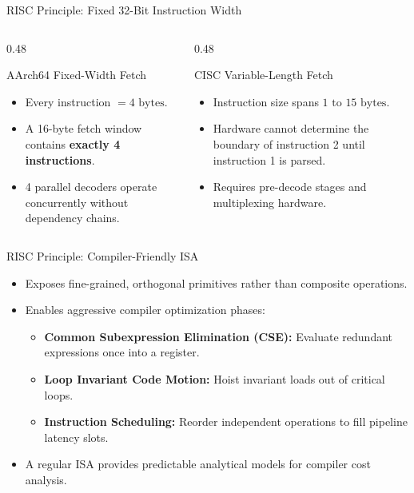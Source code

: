 \documentclass[aspectratio=169,11pt,t]{beamer}
\newcommand{\key}[1]{\textbf{#1}}
\begin{document}
\begin{frame}{RISC Principle: Fixed 32-Bit Instruction Width}
\begin{columns}[T,onlytextwidth]
\begin{column}{0.48\textwidth}
\begin{block}{AArch64 Fixed-Width Fetch}
\begin{itemize}\setlength{\itemsep}{5pt}
  \item Every instruction $= 4\text{ bytes}$.
  \item A 16-byte fetch window contains \key{exactly 4 instructions}.
  \item 4 parallel decoders operate concurrently without dependency chains.
\end{itemize}
\end{block}
\end{column}

\begin{column}{0.48\textwidth}
\begin{block}{CISC Variable-Length Fetch}
\begin{itemize}\setlength{\itemsep}{5pt}
  \item Instruction size spans $1\text{ to } 15\text{ bytes}$.
  \item Hardware cannot determine the boundary of instruction 2 until instruction 1 is parsed.
  \item Requires pre-decode stages and multiplexing hardware.
\end{itemize}
\end{block}
\end{column}
\end{columns}
\end{frame}


\begin{frame}{RISC Principle: Compiler-Friendly ISA}
\large
\begin{itemize}\setlength{\itemsep}{7pt}
  \item Exposes fine-grained, orthogonal primitives rather than composite operations.
  \item Enables aggressive compiler optimization phases:
  \begin{itemize}\setlength{\itemsep}{4pt}
    \item \key{Common Subexpression Elimination (CSE):} Evaluate redundant expressions once into a register.
    \item \key{Loop Invariant Code Motion:} Hoist invariant loads out of critical loops.
    \item \key{Instruction Scheduling:} Reorder independent operations to fill pipeline latency slots.
  \end{itemize}
  \item A regular ISA provides predictable analytical models for compiler cost analysis.
\end{itemize}
\end{frame}
\end{document}

